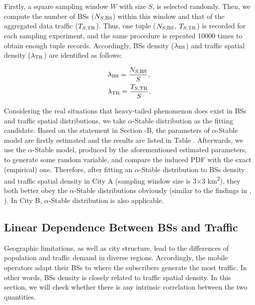 Firstly, a square sampling window ${W}$ with size ${S}$, is selected randomly. Then, we compute the number of BSs (${N_{S,\rm{BS}}}$) within this window and that of the aggregated data traffic (${T_{S,\rm{TR}}}$). Thus, one tuple (${N_{S,\rm{BS}}}$, ${T_{S,\rm{TR}}}$) is recorded for each sampling experiment, and the same procedure is repeated 10000 times to obtain enough tuple records. Accordingly, BSs density (${\lambda_{\rm{BS}}}$) and traffic spatial density (${\lambda_{\rm{TR}}}$) are identified as follows:

\begin{equation}
	\begin{aligned}
		&{\lambda_{\rm{BS}}}=\frac{N_{S,\rm{BS}}}{S},\\
		&{\lambda_{\rm{TR}}}=\frac{T_{S,\rm{TR}}}{S}.\\
	\end{aligned}
\end{equation}

Considering the real situations that heavy-tailed phenomenon does exist in BSs and traffic spatial distributions, we take $\alpha$-Stable distribution as the fitting candidate. Based on the statement in Section \uppercase\expandafter{}-{B}, the parameters of $\alpha$-Stable model are firstly estimated and the results are listed in Table \uppercase\expandafter{}. Afterwards, we use the $\alpha$-Stable model, produced by the aforementioned estimated parameters, to generate some random variable, and compare the induced PDF with the exact (empirical) one. Therefore, after fitting an $\alpha$-Stable distribution to BSs density and traffic spatial density in City A (sampling window size is 3${\times}$3 km\textsuperscript{2}), they both better obey the $\alpha$-Stable distributions obviously (similar to the findings in \cite{crovella1997self}, \cite{zhou2015alpha}). In City B, $\alpha$-Stable distribution is also applicable.

\subsection{Linear Dependence Between BSs and Traffic}
Geographic limitations, as well as city structure, lead to the differences of population and traffic demand in diverse regions. Accordingly, the mobile operators adapt their BSs to where the subscribers generate the most traffic. In other words, BSs density is closely related to traffic spatial density. In this section, we will check whether there is any intrinsic correlation between the two quantities.


